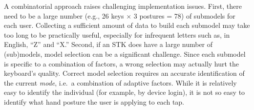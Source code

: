 \documentclass{sigchi}
\begin{document}
A combinatorial approach raises challenging implementation issues. First, there need to be a large number (e.g., 26 keys $\times$ 3 postures = 78) of submodels for each user. Collecting a sufficient amount of data to build each submodel may take too long to be practically useful, especially for infrequent letters such as, in English, ``Z'' and ``X.'' Second, if an STK does have a large number of (sub)models, model selection can be a significant challenge.  Since each submodel is specific to a combination of factors, a wrong selection may actually hurt the keyboard’s quality. Correct model selection requires an accurate identification of the current \textit{mode}, i.e.\ a combination of adaptive factors. While it is relatively easy to identify the individual (for example, by device login), it is not so easy to identify what hand posture the user is applying to each tap.
\end{document}
